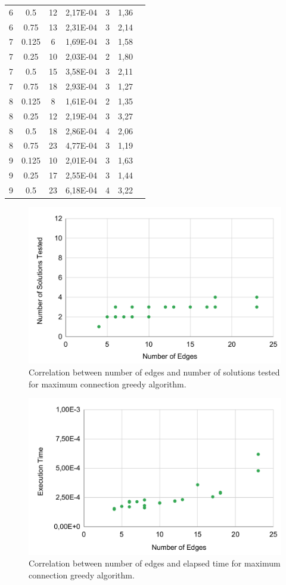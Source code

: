 \begin{table}[ht!]
{\begin{tabular}{ccccccc}
6 & 0.5 & 12 & 2,17E-04 & 3 & 1,36 \\
6 & 0.75 & 13 & 2,31E-04 & 3 & 2,14 \\
7 & 0.125 & 6 & 1,69E-04 & 3 & 1,58 \\
7 & 0.25 & 10 & 2,03E-04 & 2 & 1,80 \\
7 & 0.5 & 15 & 3,58E-04 & 3 & 2,11 \\
7 & 0.75 & 18 & 2,93E-04 & 3 & 1,27 \\
8 & 0.125 & 8 & 1,61E-04 & 2 & 1,35 \\
8 & 0.25 & 12 & 2,19E-04 & 3 & 3,27 \\
8 & 0.5 & 18 & 2,86E-04 & 4 & 2,06 \\
8 & 0.75 & 23 & 4,77E-04 & 3 & 1,19 \\
9 & 0.125 & 10 & 2,01E-04 & 3 & 1,63 \\
9 & 0.25 & 17 & 2,55E-04 & 3 & 1,44 \\
9 & 0.5 & 23 & 6,18E-04 & 4 & 3,22
\end{tabular}%
}
\end{table}

\begin{figure}[!ht]
    \centering
    \includegraphics[width=0.9\linewidth]{figs/maxc-solutions.pdf}
    \caption{Correlation between number of edges and number of solutions tested for maximum connection greedy algorithm.}
    \label{fig:maxc-sol}
\end{figure}


\begin{figure}[!ht]
    \centering
    \includegraphics[width=0.9\linewidth]{figs/maxc-time.pdf}
    \caption{Correlation between number of edges and elapsed time for maximum connection greedy algorithm.}
    \label{fig:maxc-time}
\end{figure}


